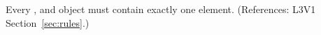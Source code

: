 Every \AssignmentRule, \RateRule and \AlgebraicRule object must contain
exactly one  element.  (References: L3V1 Section~\ref{sec:rules}.)
